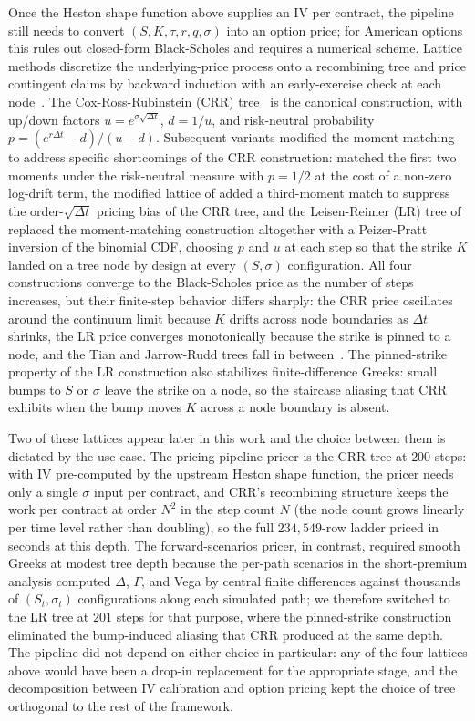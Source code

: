 Once the Heston shape function above supplies an IV per contract, the pipeline still needs to convert $(S, K, \tau, r, q, \sigma)$ into an option price; for American options this rules out closed-form Black-Scholes and requires a numerical scheme. Lattice methods discretize the underlying-price process onto a recombining tree and price contingent claims by backward induction with an early-exercise check at each node~\cite{broadie1996}. The Cox-Ross-Rubinstein (CRR) tree~\cite{cox1979} is the canonical construction, with up/down factors $u = e^{\sigma\sqrt{\Delta t}}$, $d = 1/u$, and risk-neutral probability $p = (e^{r\Delta t} - d)/(u - d)$. Subsequent variants modified the moment-matching to address specific shortcomings of the CRR construction: \citet{jarrow1983} matched the first two moments under the risk-neutral measure with $p = 1/2$ at the cost of a non-zero log-drift term, the modified lattice of \citet{tian1993} added a third-moment match to suppress the order-$\sqrt{\Delta t}$ pricing bias of the CRR tree, and the Leisen-Reimer (LR) tree of \citet{leisen1996} replaced the moment-matching construction altogether with a Peizer-Pratt inversion of the binomial CDF, choosing $p$ and $u$ at each step so that the strike $K$ landed on a tree node by design at every $(S, \sigma)$ configuration. All four constructions converge to the Black-Scholes price as the number of steps increases, but their finite-step behavior differs sharply: the CRR price oscillates around the continuum limit because $K$ drifts across node boundaries as $\Delta t$ shrinks, the LR price converges monotonically because the strike is pinned to a node, and the Tian and Jarrow-Rudd trees fall in between~\cite{leisen1996,broadie1996}. The pinned-strike property of the LR construction also stabilizes finite-difference Greeks: small bumps to $S$ or $\sigma$ leave the strike on a node, so the staircase aliasing that CRR exhibits when the bump moves $K$ across a node boundary is absent.

Two of these lattices appear later in this work and the choice between them is dictated by the use case. The pricing-pipeline pricer is the CRR tree at $200$ steps: with IV pre-computed by the upstream Heston shape function, the pricer needs only a single $\sigma$ input per contract, and CRR's recombining structure keeps the work per contract at order $N^2$ in the step count $N$ (the node count grows linearly per time level rather than doubling), so the full $234{,}549$-row ladder priced in seconds at this depth. The forward-scenarios pricer, in contrast, required smooth Greeks at modest tree depth because the per-path scenarios in the short-premium analysis computed $\Delta$, $\Gamma$, and Vega by central finite differences against thousands of $(S_t, \sigma_t)$ configurations along each simulated path; we therefore switched to the LR tree at $201$ steps for that purpose, where the pinned-strike construction eliminated the bump-induced aliasing that CRR produced at the same depth. The pipeline did not depend on either choice in particular: any of the four lattices above would have been a drop-in replacement for the appropriate stage, and the decomposition between IV calibration and option pricing kept the choice of tree orthogonal to the rest of the framework.

